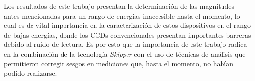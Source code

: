 Los resultados de este trabajo presentan la determinación de las magnitudes antes mencionadas para un rango de energías inaccesible hasta el momento, lo cual es de vital importancia en la caracterización de estos dispositivos en el rango de bajas energías, donde los CCDs convencionales presentan importantes barreras debido al ruido de lectura. Es por esto que la importancia de este trabajo radica en la combinación de la tecnología \textit{Skipper} con el uso de técnicas de análisis que permitieron corregir sesgos en mediciones que, hasta el momento, no habían podido realizarse.



\newpage
\thispagestyle{empty} \mbox{}
\thispagestyle{empty}
